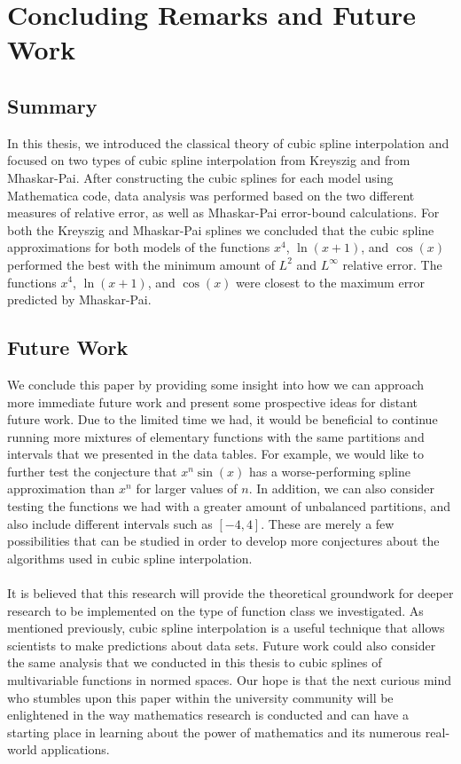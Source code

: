 

\chapter{Concluding Remarks and Future Work}
\thispagestyle{empty}
\section{Summary}

In this thesis, we introduced the classical theory of cubic spline interpolation and focused on two types of cubic spline interpolation from Kreyszig and from Mhaskar-Pai. After constructing the cubic splines for each model using Mathematica code, data analysis was performed based on the two different measures of relative error, as well as Mhaskar-Pai error-bound calculations. For both the Kreyszig and Mhaskar-Pai splines we concluded that the cubic spline approximations for both models of the functions $x^4$, $\ln(x+1)$, and $\cos(x)$ performed the best with the minimum amount of $L^2$ and $L^{\infty}$ relative error. The functions $x^4$, $\ln(x+1)$, and $\cos(x)$ were closest to the maximum error predicted by Mhaskar-Pai.
\section{Future Work}
We conclude this paper by providing some insight into how we can approach more immediate future work and present some prospective ideas for distant future work. Due to the limited time we had, it would be beneficial to continue running more mixtures of elementary functions with the same partitions and intervals that we presented in the data tables. For example, we would like to further test the conjecture that $x^n\sin(x)$ has a worse-performing spline approximation than $x^n$ for larger values of $n$. In addition, we can also consider testing the functions we had with a greater amount of unbalanced partitions, and also include different intervals such as $[-4,4]$. These are merely a few possibilities that can be studied in order to develop more conjectures about the algorithms used in cubic spline interpolation.\\\\
It is believed that this research will provide the theoretical groundwork for deeper research to be implemented on the type of function class we investigated. As mentioned previously, cubic spline interpolation is a useful technique that allows scientists to make predictions about data sets. Future work could also consider the same analysis that we conducted in this thesis to cubic splines of multivariable functions in normed spaces. Our hope is that the next curious mind who stumbles upon this paper within the university community will be enlightened in the way mathematics research is conducted and can have a starting place in learning about the power of mathematics and its numerous real-world applications.